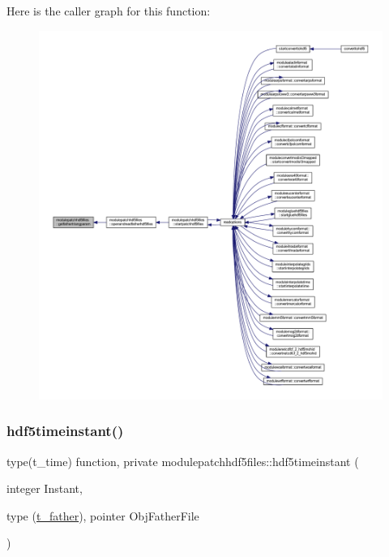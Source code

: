 Here is the caller graph for this function\+:\nopagebreak
\begin{figure}[H]
\begin{center}
\leavevmode
\includegraphics[width=350pt]{namespacemodulepatchhdf5files_ae089f4cffb7f9cab00153e6819836597_icgraph}
\end{center}
\end{figure}
\mbox{\label{namespacemodulepatchhdf5files_ae7939a4a353ce44a104d18abfe71c0ef}} 
\subsubsection{\texorpdfstring{hdf5timeinstant()}{hdf5timeinstant()}}
{\footnotesize\ttfamily type(t\+\_\+time) function, private modulepatchhdf5files\+::hdf5timeinstant (\begin{DoxyParamCaption}\item[{integer}]{Instant,  }\item[{type (\mbox{\hyperlink{structmodulepatchhdf5files_1_1t__father}{t\+\_\+father}}), pointer}]{Obj\+Father\+File }\end{DoxyParamCaption})\hspace{0.3cm}{\ttfamily [private]}}


